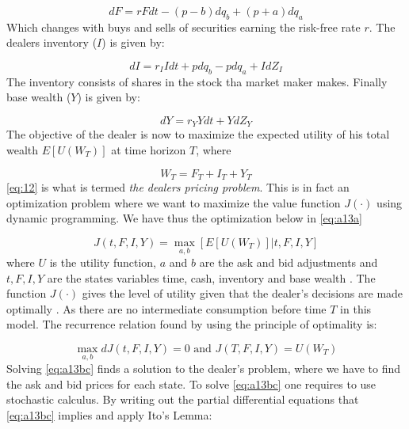 \documentclass{kththesis}
\theoremstyle{definition}
\begin{document}
\begin{equation}
    \label{eq:a9}
    dF = rFdt- (p-b)dq_b + (p+a)dq_a
\end{equation}
Which changes with buys and sells of securities earning the risk-free rate $r$. The dealers inventory ($I$) is given by:

\begin{equation}
    \label{eq:a10}
    dI = r_{I}Idt+pdq_{b} - pdq_{a} + IdZ_{I}
\end{equation}
The inventory consists of shares in the stock tha market maker makes.
Finally base wealth ($Y$) is given by:

\begin{equation}
    \label{eq:a11}
    dY = r_{Y}Ydt+YdZ_{Y} 
\end{equation}
The objective of the dealer is now to maximize the expected utility of his total wealth $E[U(W_T)]$ at time horizon $T$, where 

\begin{equation}
    \label{eq:a12}
    W_{T} = F_{T} + I_{T} + Y_{T}
\end{equation}
\autoref{eq:12} is what is termed \textit{the dealers pricing problem}. This is in fact an optimization problem where we want to maximize the value function $J(\cdot)$ using dynamic programming. We have thus the optimization below in \autoref{eq:a13a}

\begin{equation}
    \label{eq:a13a}
    J(t,F,I,Y) = \underset{a,b}{\max}[E[U(W_T)] | t,F,I,Y]
\end{equation}
where $U$ is the utility function, $a$ and $b$ are the ask and bid adjustments and $t, F, I,Y$ are the states variables time, cash, inventory and base wealth \parencite{o1995market}. The function $J(\cdot)$ gives the level of utility given that the dealer's decisions are made optimally \parencite{o1995market}. As there are no intermediate consumption before time $T$ in this model. The recurrence relation found by using the principle of optimality is:

\begin{equation}
    \label{eq:a13bc}
    \underset{a,b}{\max}dJ(t,F,I,Y)=0 \text{ and } 
    J(T,F,I,Y)=U(W_T)
\end{equation}
Solving \autoref{eq:a13bc} finds a solution to the dealer's problem, where we have to find the ask and bid prices for each state. To solve \autoref{eq:a13bc} one requires to use stochastic calculus. By writing out the partial differential equations that \autoref{eq:a13bc} implies and apply Ito's Lemma:
\end{document}
